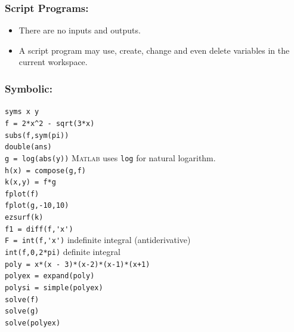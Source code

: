 
\subsubsection*{Script Programs:}
\begin{itemize}
\item There are no inputs and outputs.
\item A script program may use, create, change and even delete variables in the current
  workspace.
\end{itemize}


\subsubsection*{Symbolic:}

\verb&syms x y&\\
\verb&f = 2*x^2 - sqrt(3*x)&\\
\verb&subs(f,sym(pi)) &\\
\verb&double(ans)&\\
\verb&g = log(abs(y))& \dotfill \textsc{Matlab} uses \verb&log& for
                                     natural logarithm.\\
\verb&h(x) = compose(g,f)&\\
\verb&k(x,y) = f*g &\\
\verb&fplot(f)&\\
\verb&fplot(g,-10,10)&\\
\verb&ezsurf(k)&\\
%
\verb&f1 = diff(f,'x')& \\
\verb&F = int(f,'x')& \dotfill indefinite integral (antiderivative)\\
\verb&int(f,0,2*pi)& \dotfill definite integral\\
%
\verb&poly = x*(x - 3)*(x-2)*(x-1)*(x+1)&\\
\verb&polyex = expand(poly)&\\
\verb&polysi = simple(polyex)&\\
%
\verb&solve(f)&\\
\verb&solve(g)&\\
\verb&solve(polyex)&

